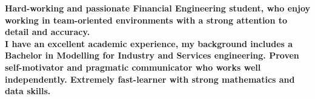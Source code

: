 \documentclass[10pt,a4paper,ragged2e]{altacv}
\begin{document}

\begin{fullwidth}
\makecvheader
\end{fullwidth}


{\bf Hard-working and passionate Financial Engineering student, who enjoy working  in team-oriented environments with a strong attention to detail and accuracy.\\
I have an excellent academic experience, my background includes a Bachelor in Modelling for Industry and Services engineering. Proven self-motivator and pragmatic communicator who works well independently. Extremely fast-learner with strong mathematics and data  skills.} 
\end{document}
